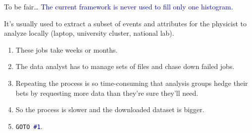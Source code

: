 \documentclass[aspectratio=169]{beamer}
\begin{document}
\begin{frame}{To be fair\ldots}
\vspace{0.5 cm}
\large \textcolor{darkblue}{The current framework is never used to fill only one histogram.}

\vspace{0.5 cm}
It's usually used to extract a subset of events and attributes for the physicist to analyze locally (laptop, university cluster, national lab).

\vspace{0.25 cm}
\begin{enumerate}
\item<2-> These jobs take weeks or months.
\item<3-> The data analyst has to manage sets of files and chase down failed jobs.
\item<4-> Repeating the process is so time-consuming that analysis groups hedge their bets by requesting more data than they're sure they'll need.
\item<5-> So the process is slower and the downloaded dataset is bigger.
\item<6-> {\tt\normalsize GOTO \textcolor{darkblue}{\#1}}.
\end{enumerate}
\end{frame}
\end{document}
